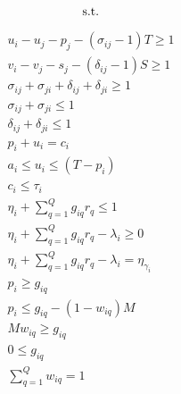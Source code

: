 \documentclass[conference]{IEEEtran}
\begin{document}
\begin{equation*}
    \textrm{s.t.}                                                \\
\end{equation*}

\begin{subequations}
\begin{align}
    u_i - u_j - p_j - (\sigma_{ij} - 1)T \geq 1                           \label{subeq:time}         \\
    v_i - v_j - s_j - (\delta_{ij} - 1)S \geq 1                           \label{subeq:space}        \\
    \sigma_{ij} + \sigma_{ji} + \delta_{ij} + \delta_{ji} \geq 1          \label{subeq:valid_pos}    \\
    \sigma_{ij} + \sigma_{ji} \leq 1                                      \label{subeq:sigma}        \\
    \delta_{ij} + \delta_{ji} \leq 1                                      \label{subeq:delta}        \\
    p_i + u_i = c_i                                                       \label{subeq:detach}       \\
    a_i \leq u_i \leq (T - p_i)                                           \label{subeq:valid_starts} \\
    c_i \leq \tau_i                                                       \label{subeq:valid_depart} \\
    \eta_i + \sum_{q=1}^Q g_{iq} r_q \leq 1                        \label{subeq:max_charge}   \\
    \eta_i + \sum_{q=1}^Q g_{iq} r_q - \lambda_i \geq 0            \label{subeq:min_charge}   \\
    \eta_i + \sum_{q=1}^Q g_{iq} r_q - \lambda_i = \eta_{\gamma_i} \label{subeq:next_charge}  \\
    p_i \geq g_{iq}                                                       \label{subeq:gpgret}       \\
    p_i \leq g_{iq} - (1 - w_{iq})M                                       \label{subeq:gpsmol}       \\
    Mw_{iq} \geq g_{iq}                                                   \label{subeq:gwgret}       \\
    0 \leq g_{iq}                                                         \label{subeq:gwsmol}       \\
    \sum_{q=1}^Q w_{iq} = 1                                               \label{subeq:wmax}         \\
\end{align}
\end{subequations}
\end{document}
